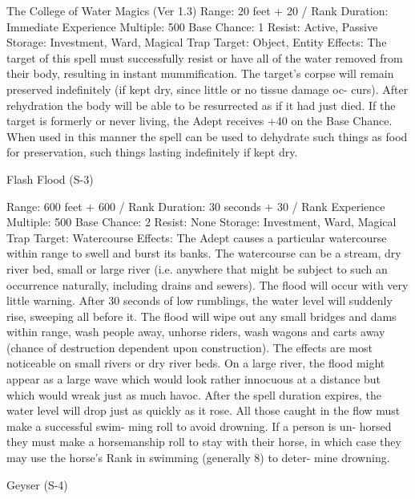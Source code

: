 \begin{Chapter}{The College of Water Magics (Ver 1.3)}
Range: 20 feet + 20 / Rank 
Duration: Immediate 
Experience Multiple: 500 
Base Chance: 1%
Resist: Active, Passive 
Storage: Investment, Ward, Magical Trap 
Target: Object, Entity 
Effects:  The  target  of  this  spell  must  successfully 
resist  or  have  all  of  the  water  removed  from  their 
body,  resulting  in  instant  mummification.  The 
target’s  corpse  will  remain  preserved  indefinitely 
(if  kept  dry,  since  little  or  no  tissue  damage  oc-
curs). After rehydration the body will be able to be 
resurrected  as  if  it  had  just  died.  If  the  target  is 
formerly or never living, the Adept receives +40%
on the Base Chance. When used in this manner the 
spell can be used to dehydrate such things as food 
for  preservation,  such  things  lasting  indefinitely  if 
kept dry. 

Flash Flood (S-3) 

Range: 600 feet + 600 / Rank 
Duration: 30 seconds + 30 / Rank 
Experience Multiple: 500 
Base Chance: 2%
Resist: None 
Storage: Investment, Ward, Magical Trap 
Target: Watercourse 
Effects: The Adept causes a particular watercourse 
within  range  to  swell  and  burst  its  banks.  The 
watercourse  can  be  a  stream,  dry  river  bed,  small 
or  large  river  (i.e.  anywhere  that  might  be  subject 
to  such  an  occurrence  naturally,  including  drains 
and  sewers).  The  flood  will  occur  with  very  little 
warning.  After  30  seconds  of  low  rumblings,  the 
water  level  will suddenly rise, sweeping all before 
it.  The  flood  will  wipe  out  any  small  bridges  and 
dams  within  range,  wash  people  away,  unhorse 
riders,  wash  wagons  and  carts  away  (chance  of 
destruction  dependent  upon  construction).  The 
effects  are  most  noticeable  on  small  rivers  or  dry 
river beds. On a large river, the flood might appear 
as a large wave which would look rather innocuous 
at a distance  but  which  would  wreak  just as  much 
havoc.  After  the  spell  duration  expires,  the  water 
level  will drop just as quickly as it rose.  All those 
caught  in  the  flow  must  make  a  successful  swim-
ming  roll  to  avoid  drowning.  If  a  person  is  un-
horsed they must make a horsemanship roll to stay 
with  their  horse,  in  which  case  they  may  use  the 
horse’s  Rank  in  swimming  (generally  8)  to  deter-
mine drowning. 

Geyser (S-4) 


\end{Chapter}
